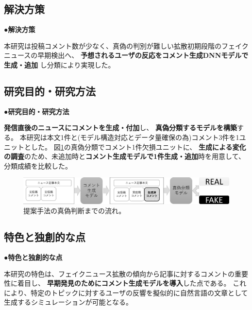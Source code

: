 {	\subsection{解決方策}
	\noindent
	●\textbf{解決方策}

	本研究は投稿コメント数が少なく、真偽の判別が難しい拡散初期段階のフェイクニュースの早期検出へ、
	\textbf{予想されるユーザの反応をコメント生成DNNモデルで生成・追加}
	し分類により実現した。

	\subsection{研究目的・研究方法}
	\noindent
	●\textbf{研究目的・研究方法}

	\textbf{発信直後のニュースにコメントを⽣成・付加}し、
	\textbf{真偽分類するモデルを構築}する。
	本研究は本文1件と(モデル構造対応とデータ量確保の為)コメント3件を1ユニットとした。
	図\ref{fig:model}の真偽分類でコメント1件欠損ユニットに、
	\textbf{生成による変化の調査}のため、未追加時と\textbf{コメント生成モデルで1件生成・追加}時を用意して、分類成績を比較した。
	
	\begin{figure}[ht]
		\centering
		\includegraphics[width=0.95\linewidth]{figs/model.pdf}
		\vspace*{-3mm}
		\caption{提案手法の真偽判断までの流れ。}
		\label{fig:model}
	\end{figure}
	\vspace*{-4mm}
	\subsection{特色と独創的な点}
	\noindent
	●\textbf{特色と独創的な点}

	本研究の特⾊は、フェイクニュース拡散の傾向から記事に対するコメントの重要性に着目し、
	\textbf{早期発⾒のためにコメント⽣成モデルを導⼊}した点である。
	これにより、特定のトピックに対するユーザの反響を擬似的に自然言語の文章として生成するシミュレーションが可能となる。

}
